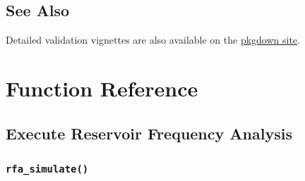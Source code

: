 \documentclass[
  letterpaper,
  DIV=11,
  numbers=noendperiod]{scrreprt}
\begin{document}
\section{See Also}\label{see-also}

Detailed validation vignettes are also available on the
\href{https://usace-rmc.github.io/rfaR/articles/index.html}{pkgdown
site}.


\chapter{Function Reference}\label{function-reference}

\section{Execute Reservoir Frequency
Analysis}\label{execute-reservoir-frequency-analysis}

\subsection{\texorpdfstring{\texttt{rfa\_simulate()}}{rfa\_simulate()}}\label{rfa_simulate}
\end{document}
